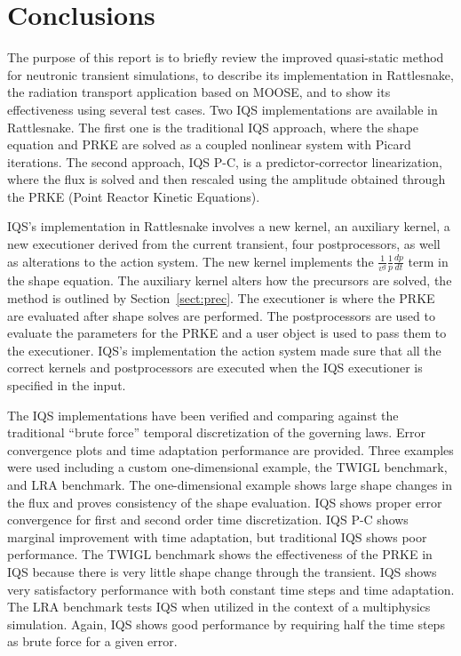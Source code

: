 \documentclass[12pt]{scrartcl}
\newcommand{\rattlesnake}{Rattlesnake }
\newcommand{\sct}[1]{Section~\ref{#1}}                   %
\begin{document}
\section{Conclusions}

The purpose of this report is to briefly review the improved quasi-static method for neutronic transient simulations, to describe its implementation in Rattlesnake, the radiation transport application based on MOOSE, and to show its effectiveness using several test cases.  
Two IQS implementations are available in Rattlesnake.  The first one is the traditional IQS approach, where the shape equation and PRKE are solved as a coupled nonlinear system with Picard iterations.  The second approach, IQS P-C, is a predictor-corrector linearization, where the flux is solved and then rescaled using the amplitude obtained through the PRKE
(Point Reactor Kinetic Equations). \vspace{2mm}

IQS's implementation in \rattlesnake involves a new kernel, an auxiliary kernel, a new executioner derived from the current transient, four postprocessors, as well as alterations to the action system.  The new kernel implements the $\frac{1}{v^g}\frac{1}{p}\frac{dp}{dt}$ term in the shape equation.  The auxiliary kernel alters how the precursors are solved, the method is outlined by \sct{sect:prec}.  The executioner is where the PRKE are evaluated after shape solves are performed.  The postprocessors are used to evaluate the parameters for the PRKE and a user object is used to pass them to the executioner.  IQS's implementation the action system made sure that all the correct kernels and postprocessors are executed when the IQS executioner is specified in the input. \vspace{2mm}

The IQS implementations have been verified and comparing against the traditional ``brute force'' temporal discretization of the governing laws. Error convergence plots and time adaptation performance are provided.  Three examples were used including a custom one-dimensional example, the TWIGL benchmark, and LRA benchmark.  The one-dimensional example shows large shape changes in the flux and proves consistency of the shape evaluation. IQS shows proper error convergence for first and second order time discretization. IQS P-C shows marginal improvement with time adaptation, but traditional IQS shows poor performance.  The TWIGL benchmark shows the effectiveness of the PRKE in IQS because there is very little shape change through the transient.  IQS shows very satisfactory performance with both constant time steps and time adaptation.  The LRA benchmark tests IQS when utilized in the context of a multiphysics simulation.  Again, IQS shows good performance by requiring half the time steps as brute force for a given error.
\end{document}
